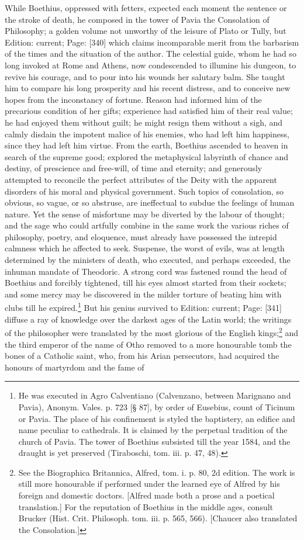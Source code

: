 While Boethius, oppressed with fetters, expected each moment the sentence or the stroke of death, he composed in the tower of Pavia the Consolation of Philosophy; a golden volume not unworthy of the leisure of Plato or Tully, but Edition: current; Page: [340] which claims incomparable merit from the barbarism of the times and the situation of the author. The celestial guide, whom he had so long invoked at Rome and Athens, now condescended to illumine his dungeon, to revive his courage, and to pour into his wounds her salutary balm. She taught him to compare his long prosperity and his recent distress, and to conceive new hopes from the inconstancy of fortune. Reason had informed him of the precarious condition of her gifts; experience had satisfied him of their real value; he had enjoyed them without guilt; he might resign them without a sigh, and calmly disdain the impotent malice of his enemies, who had left him happiness, since they had left him virtue. From the earth, Boethius ascended to heaven in search of the supreme good; explored the metaphysical labyrinth of chance and destiny, of prescience and free-will, of time and eternity; and generously attempted to reconcile the perfect attributes of the Deity with the apparent disorders of his moral and physical government. Such topics of consolation, so obvious, so vague, or so abstruse, are ineffectual to subdue the feelings of human nature. Yet the sense of misfortune may be diverted by the labour of thought; and the sage who could artfully combine in the same work the various riches of philosophy, poetry, and eloquence, must already have possessed the intrepid calmness which he affected to seek. Suspense, the worst of evils, was at length determined by the ministers of death, who executed, and perhaps exceeded, the inhuman mandate of Theodoric. A strong cord was fastened round the head of Boethius and forcibly tightened, till his eyes almost started from their sockets; and some mercy may be discovered in the milder torture of beating him with clubs till he expired.\footnote{He was executed in Agro Calventiano (Calvenzano, between Marignano and Pavia), Anonym. Vales. p. 723 [§ 87], by order of Eusebius, count of Ticinum or Pavia. The place of his confinement is styled the baptistery, an edifice and name peculiar to cathedrals. It is claimed by the perpetual tradition of the church of Pavia. The tower of Boethius subsisted till the year 1584, and the draught is yet preserved (Tiraboschi, tom. iii. p. 47, 48).} But his genius survived to Edition: current; Page: [341] diffuse a ray of knowledge over the darkest ages of the Latin world; the writings of the philosopher were translated by the most glorious of the English kings;\footnote{See the Biographica Britannica, Alfred, tom. i. p. 80, 2d edition. The work is still more honourable if performed under the learned eye of Alfred by his foreign and domestic doctors. [Alfred made both a prose and a poetical translation.] For the reputation of Boethius in the middle ages, consult Brucker (Hist. Crit. Philosoph. tom. iii. p. 565, 566). [Chaucer also translated the Consolation.]} and the third emperor of the name of Otho removed to a more honourable tomb the bones of a Catholic saint, who, from his Arian persecutors, had acquired the honours of martyrdom and the fame of 
